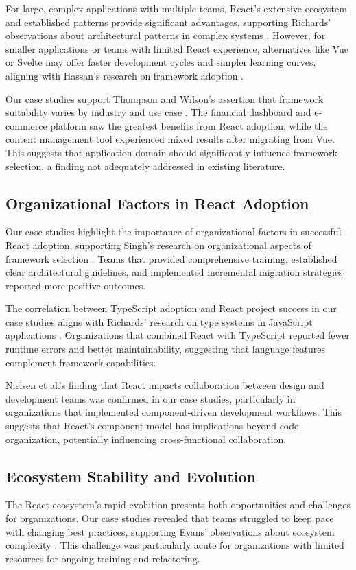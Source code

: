 For large, complex applications with multiple teams, React's extensive ecosystem and established patterns provide significant advantages, supporting Richards' observations about architectural patterns in complex systems \cite{richards2020}. However, for smaller applications or teams with limited React experience, alternatives like Vue or Svelte may offer faster development cycles and simpler learning curves, aligning with Hassan's research on framework adoption \cite{hassan2019}.

Our case studies support Thompson and Wilson's assertion that framework suitability varies by industry and use case \cite{thompson2022}. The financial dashboard and e-commerce platform saw the greatest benefits from React adoption, while the content management tool experienced mixed results after migrating from Vue. This suggests that application domain should significantly influence framework selection, a finding not adequately addressed in existing literature.

\subsection{Organizational Factors in React Adoption}
Our case studies highlight the importance of organizational factors in successful React adoption, supporting Singh's research on organizational aspects of framework selection \cite{singh2021}. Teams that provided comprehensive training, established clear architectural guidelines, and implemented incremental migration strategies reported more positive outcomes.

The correlation between TypeScript adoption and React project success in our case studies aligns with Richards' research on type systems in JavaScript applications \cite{richards2020}. Organizations that combined React with TypeScript reported fewer runtime errors and better maintainability, suggesting that language features complement framework capabilities.

Nielsen et al.'s finding that React impacts collaboration between design and development teams \cite{nielsen2021} was confirmed in our case studies, particularly in organizations that implemented component-driven development workflows. This suggests that React's component model has implications beyond code organization, potentially influencing cross-functional collaboration.

\subsection{Ecosystem Stability and Evolution}
The React ecosystem's rapid evolution presents both opportunities and challenges for organizations. Our case studies revealed that teams struggled to keep pace with changing best practices, supporting Evans' observations about ecosystem complexity \cite{evans2020}. This challenge was particularly acute for organizations with limited resources for ongoing training and refactoring.

